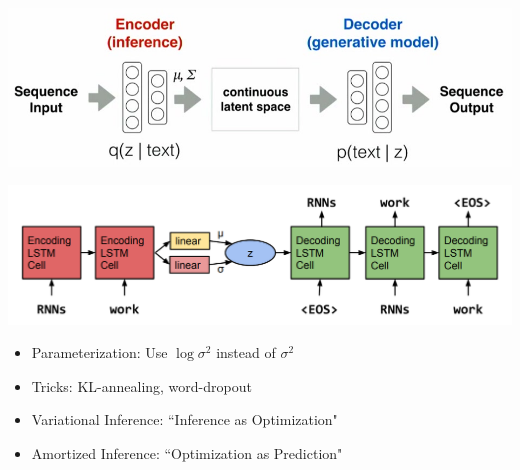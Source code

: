 \begin{frame}
  \begin{center}
   \end{center}
   \center
   \includegraphics[scale=0.35]{text-vae} \\

\end{frame}

\begin{frame}
  \begin{center}
   \end{center}
   \center
   \includegraphics[scale=0.3]{lstmvae} 
  \\
     \vspace{5mm}
\end{frame}

\begin{frame}
  \begin{center}
   \end{center}
\begin{itemize}
\item Parameterization: Use $\log \sigma^2$ instead of $\sigma^2$ 
\item Tricks: KL-annealing, word-dropout
\end{itemize}
\end{frame}

\begin{frame}
  \begin{center}
   \end{center}
\begin{itemize}
\item Variational Inference: ``Inference as Optimization"
\item Amortized  Inference: ``Optimization as Prediction"
\end{itemize}
\end{frame}